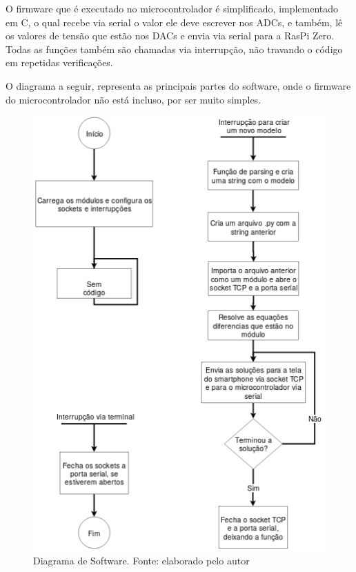 \documentclass[journal]{IEEEtranTIE}
\begin{document}
O firmware que é executado no microcontrolador é simplificado, implementado em C, o qual recebe via serial o valor ele deve escrever nos ADCs, e também, lê os valores de tensão que estão nos DACs e envia via serial para a RasPi Zero. Todas as funções também são chamadas via interrupção, não travando o código em repetidas verificações.

O diagrama a seguir, representa as principais partes do software, onde o firmware do microcontrolador não está incluso, por ser muito simples.

\begin{figure}[H]
	\includegraphics[width=\linewidth]{img/software.png}
    \caption{Diagrama de Software. Fonte: elaborado pelo autor}
    \label{fig:real}
\end{figure}
\end{document}
